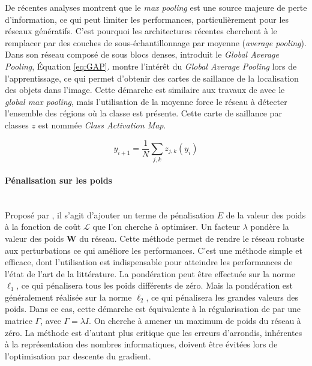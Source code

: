 De récentes analyses montrent que le \textit{max pooling} est une source majeure de perte d'information, ce qui peut limiter les performances, particulièrement pour les réseaux génératifs.
C'est pourquoi les architectures récentes cherchent à le remplacer par des couches de sous-échantillonnage par moyenne (\textit{average pooling}).
Dans son réseau composé de sous blocs denses, \cite{lin_network_2013} introduit le \textit{Global Average Pooling}, Équation \ref{eq:GAP}.
\cite{zhou_learning_2015} montre l'intérêt du \textit{Global Average Pooling} lors de l'apprentissage, ce qui permet d'obtenir des cartes de saillance de la localisation des objets dans l'image.
Cette démarche est similaire aux travaux de \citeauthor{oquab_object_2015} \cite{oquab_object_2015} avec le \textit{global max pooling}, mais l'utilisation de la moyenne force le réseau à détecter l'ensemble des régions où la classe est présente.
Cette carte de saillance par classes $z$ est nommée \textit{Class Activation Map}.

\begin{equation} \label{eq:GAP}
y_{i+1} = \frac{1}{N} \sum_{j, k} z_{j, k}(y_i)
\end{equation}


\paragraph{Pénalisation sur les poids}\mbox{} \label{parag:weights_decay} \\
Proposé par \citeauthor{krogh_simple_1991} \cite{krogh_simple_1991}, il s'agit d'ajouter un terme de pénalisation $E$ de la valeur des poids à la fonction de coût $\mathcal{L}$ que l'on cherche à optimiser.
Un facteur $\lambda$ pondère la valeur des poids $\mathbf{W}$ du réseau.
Cette méthode permet de rendre le réseau robuste aux perturbations ce qui améliore les performances.
C'est une méthode simple et efficace, dont l'utilisation est indispensable pour atteindre les performances de l'état de l'art de la littérature.
La pondération peut être effectuée sur la norme $\ell_{1}$, ce qui pénalisera tous les poids différents de zéro.
Mais la pondération est généralement réalisée sur la norme $\ell_{2}$, ce qui pénalisera les grandes valeurs des poids.
Dans ce cas, cette démarche est équivalente à la régularisation de \citeauthor{tikhonov_stability_1943} \cite{tikhonov_stability_1943, tikhonov_solutions_1977} par une matrice $\Gamma$, avec $\Gamma=\lambda I$.
On cherche à amener un maximum de poids du réseau à zéro.
La méthode est d'autant plus critique que les erreurs d'arrondis, inhérentes à la représentation des nombres informatiques, doivent être évitées lors de l'optimisation par descente du gradient.

